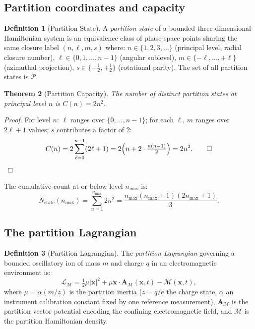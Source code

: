 \documentclass[twocolumn,10pt,a4paper]{article}
\theoremstyle{thmstyle}
\newtheorem{theorem}{Theorem}[section]
\theoremstyle{definition}
\newtheorem{definition}[theorem]{Definition}
\theoremstyle{remark}
\newcommand{\calP}{\mathcal{P}}
\newcommand{\LM}{\mathcal{L}_{\mathcal{M}}}
\newcommand{\AM}{\mathbf{A}_{\mathcal{M}}}
\newcommand{\Mop}{\mathcal{M}}
\begin{document}
\subsection{Partition coordinates and capacity}

\begin{definition}[Partition State]
\label{def:pstate}
A \emph{partition state} of a bounded three-dimensional Hamiltonian
system is an equivalence class of phase-space points sharing the same
closure label $(n, \ell, m, s)$ where:
$n \in \{1,2,3,\ldots\}$ (principal level, radial closure number),
$\ell \in \{0,1,\ldots,n-1\}$ (angular sublevel),
$m \in \{-\ell,\ldots,+\ell\}$ (azimuthal projection),
$s \in \{-\tfrac{1}{2}, +\tfrac{1}{2}\}$ (rotational parity).
The set of all partition states is $\calP$.
\end{definition}

\begin{theorem}[Partition Capacity]
\label{thm:capacity}
The number of distinct partition states at principal level $n$ is
$C(n) = 2n^2$.
\end{theorem}

\begin{proof}
For level $n$: $\ell$ ranges over $\{0,\ldots,n-1\}$; for each $\ell$,
$m$ ranges over $2\ell+1$ values; $s$ contributes a factor of 2:
\[
C(n) = 2\sum_{\ell=0}^{n-1}(2\ell+1) = 2\!\left(n + 2\cdot\tfrac{n(n-1)}{2}\right) = 2n^2.\qed
\]
\end{proof}

The cumulative count at or below level $n_{\max}$ is:
\begin{equation}
N_{\text{state}}(n_{\max}) = \sum_{n=1}^{n_{\max}} 2n^2
= \frac{n_{\max}(n_{\max}+1)(2n_{\max}+1)}{3}.
\label{eq:cumcount}
\end{equation}

\subsection{The partition Lagrangian}
\label{sec:lagrangian}

\begin{definition}[Partition Lagrangian]
\label{def:lagrangian}
The \emph{partition Lagrangian} governing a bounded oscillatory ion of
mass $m$ and charge $q$ in an electromagnetic environment is:
\begin{equation}
\LM = \tfrac{1}{2}\mu|\dot{\mathbf{x}}|^2
+ \mu\dot{\mathbf{x}}\cdot\AM(\mathbf{x},t)
- \Mop(\mathbf{x},t),
\label{eq:lagrangian}
\end{equation}
where $\mu = \alpha(m/z)$ is the partition inertia ($z = q/e$ the charge
state, $\alpha$ an instrument calibration constant fixed by one reference
measurement), $\AM$ is the partition vector potential encoding the
confining electromagnetic field, and $\Mop$ is the partition Hamiltonian
density.
\end{definition}
\end{document}

